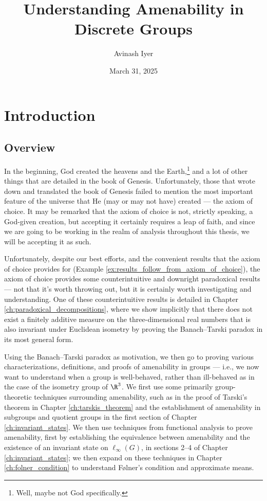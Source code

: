 \documentclass[11pt]{package2}
\title{Understanding Amenability in Discrete Groups\\\vspace{5pt}{\large A Gentle Introduction to Higher Analysis}}
\author{Avinash Iyer}
\date{March 31, 2025}
\begin{document}
\maketitle
\RaggedRight
\tableofcontents
\chapter{Introduction}
\section{Overview}%
In the beginning, God created the heavens and the Earth,\footnote{Well, maybe not God specifically.} and a lot of other things that are detailed in the book of Genesis. Unfortunately, those that wrote down and translated the book of Genesis failed to mention the most important feature of the universe that He (may or may not have) created --- the axiom of choice. It may be remarked that the axiom of choice is not, strictly speaking, a God-given creation, but accepting it certainly requires a leap of faith, and since we are going to be working in the realm of analysis throughout this thesis, we will be accepting it as such.\newline

Unfortunately, despite our best efforts, and the convenient results that the axiom of choice provides for (Example \ref{ex:results_follow_from_axiom_of_choice}), the axiom of choice provides some counterintuitive and downright paradoxical results --- not that it's worth throwing out, but it is certainly worth investigating and understanding. One of these counterintuitive results is detailed in Chapter \ref{ch:paradoxical_decompositions}, where we show implicitly that there does not exist a finitely additive measure on the three-dimensional real numbers that is also invariant under Euclidean isometry by proving the Banach--Tarski paradox in its most general form.\newline

Using the Banach--Tarski paradox as motivation, we then go to proving various characterizations, definitions, and proofs of amenability in groups --- i.e., we now want to understand when a group is well-behaved, rather than ill-behaved as in the case of the isometry group of $\R^3$. We first use some primarily group-theoretic techniques surrounding amenability, such as in the proof of Tarski's theorem in Chapter \ref{ch:tarskis_theorem} and the establishment of amenability in subgroups and quotient groups in the first section of Chapter \ref{ch:invariant_states}. We then use techniques from functional analysis to prove amenability, first by establishing the equivalence between amenability and the existence of an invariant state on $\ell_{\infty}(G)$, in sections 2--4 of Chapter \ref{ch:invariant_states}; we then expand on these techniques in Chapter \ref{ch:folner_condition} to understand Følner's condition and approximate means.\newline
\end{document}
